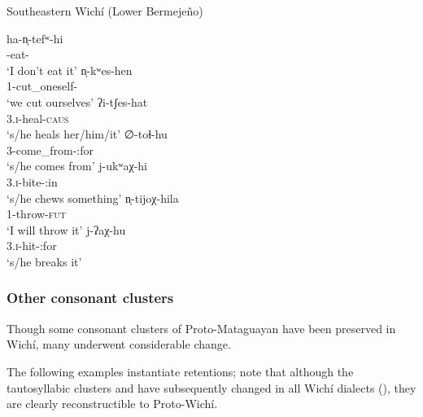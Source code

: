\ea
Southeastern Wichí (Lower Bermejeño) \citep[108–109]{VN14}\\
    \begin{xlist}
        \ex\gll ha-n̩-tefʷ-hi~\\
                -eat-\NEG\\
                \glt `I don't eat it'
        \ex\gll n̩-kʷes-hen~\\
                1-cut\_oneself-\PL\\
                \glt `we cut ourselves'
        \ex\gll ʔi-tʃes-hat~\\
                3.{\textsc{i}}-heal-{\textsc{caus}}\\
                \glt `s/he heals her/him/it'
        \ex\gll ∅-toɬ-hu~\\
                3-come\_from-\APPL:for\\
                \glt `s/he comes from'
        \ex\gll j-ukʷaχ-hi~\\
                3.{\textsc{i}}-bite-\APPL:in\\
                \glt `s/he chews something'
        \ex\gll n̩-tijoχ-hila~\\
                1-throw-{\textsc{fut}}\\
                \glt `I will throw it'
        \ex\gll j-ʔaχ-hu~\\
                3.{\textsc{i}}-hit-\APPL:for\\
                \glt `s/he breaks it'
    \end{xlist}
\z

\subsubsection{Other consonant clusters} \label{wi-other-clusters}

Though some consonant clusters of Proto-Mataguayan have been preserved in Wichí, many underwent considerable change.

The following examples instantiate retentions; note that although the tautosyllabic clusters  and  have subsequently changed in all Wichí dialects (), they are clearly reconstructible to Proto-Wichí.

\begin{exe}
    \ex \tortoise
    \ex \whitealgarrobof
    \ex \dovesipup
    \ex \precipice
\end{exe}


